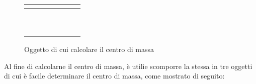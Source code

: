 \documentclass[a4paper]{extarticle}
\begin{document}
\begin{figure}[H]
  \centering
  \begin{tabular}{|c|c|c|c|c|c|c|}
    \hline
    $ $ & $ $ & $ $ & $ $ & $ $ & $ $ & $ $\\
    \hline
    $ $ & \cellcolor{blue!25}$ $ & \cellcolor{blue!25}$ $ & \cellcolor{blue!25}$ $ & \cellcolor{blue!25}$ $ & \cellcolor{blue!25}$ $ & $ $\\
    \hline
    $ $ & \cellcolor{blue!25}$ $ & $ $ & $ $ & $ $ & $ $ & $ $\\
    \hline
    $ $ & \cellcolor{blue!25}$ $ & $ $ & $ $ & $ $ & $ $ & $ $\\
    \hline
    $ $ & \cellcolor{blue!25}$ $ & \cellcolor{blue!25}$ $ & \cellcolor{blue!25}$ $ & $ $ & $ $ & $ $\\
    \hline
    $ $ & \cellcolor{blue!25}$ $ & $ $ & $ $ & $ $ & $ $ & $ $\\
    \hline
    $ $ & \cellcolor{blue!25}$ $ & $ $ & $ $ & $ $ & $ $ & $ $\\
    \hline
    $ $ & \cellcolor{blue!25}$ $ & $ $ & $ $ & $ $ & $ $ & $ $\\
    \hline
    $ $ & \cellcolor{blue!25}$ $ & $ $ & $ $ & $ $ & $ $ & $ $\\
    \hline
    $ $ & $ $ & $ $ & $ $ & $ $ & $ $ & $ $\\
    \hline
  \end{tabular}
  \caption{Oggetto di cui calcolare il centro di massa}
  \label{fig:calcolo_centro_massa_figura}
\end{figure}

\noindent
Al fine di calcolarne il centro di massa, è utilie scomporre la stessa in tre oggetti di cui è facile determinare il centro di massa, come mostrato di seguito:
\end{document}
